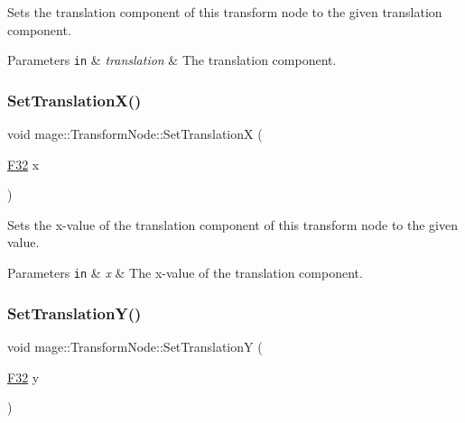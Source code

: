 Sets the translation component of this transform node to the given translation component.


\begin{DoxyParams}[1]{Parameters}
\mbox{\tt in}  & {\em translation} & The translation component. \\
\hline
\end{DoxyParams}
\hypertarget{classmage_1_1_transform_node_a68710665ddc9fcba38840bd51c85b3e6}{}\label{classmage_1_1_transform_node_a68710665ddc9fcba38840bd51c85b3e6} 
\subsubsection{\texorpdfstring{Set\+Translation\+X()}{SetTranslationX()}}
{\footnotesize\ttfamily void mage\+::\+Transform\+Node\+::\+Set\+TranslationX (\begin{DoxyParamCaption}\item[{\hyperlink{namespacemage_aa97e833b45f06d60a0a9c4fc22ae02c0}{F32}}]{x }\end{DoxyParamCaption})\hspace{0.3cm}{\ttfamily [noexcept]}}

Sets the x-\/value of the translation component of this transform node to the given value.


\begin{DoxyParams}[1]{Parameters}
\mbox{\tt in}  & {\em x} & The x-\/value of the translation component. \\
\hline
\end{DoxyParams}
\hypertarget{classmage_1_1_transform_node_a95f1b55e153664196d76d0664674569e}{}\label{classmage_1_1_transform_node_a95f1b55e153664196d76d0664674569e} 
\subsubsection{\texorpdfstring{Set\+Translation\+Y()}{SetTranslationY()}}
{\footnotesize\ttfamily void mage\+::\+Transform\+Node\+::\+Set\+TranslationY (\begin{DoxyParamCaption}\item[{\hyperlink{namespacemage_aa97e833b45f06d60a0a9c4fc22ae02c0}{F32}}]{y }\end{DoxyParamCaption})\hspace{0.3cm}{\ttfamily [noexcept]}}


